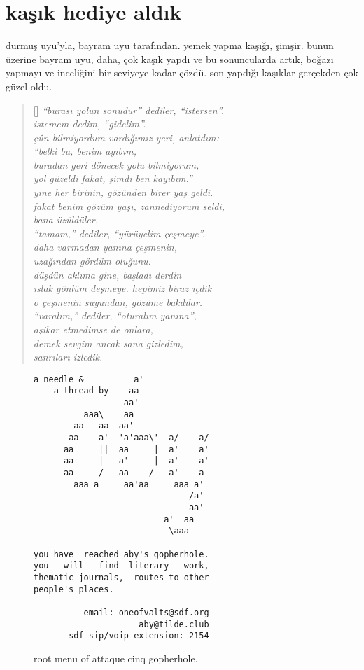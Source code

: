 \documentclass[9pt, a5paper, twocolumn, openright]{memoir}
\begin{document}
\section{kaşık hediye aldık}
durmuş uyu'yla, bayram uyu tarafından. yemek yapma kaşığı, şimşir.
bunun üzerine bayram uyu, daha, çok kaşık yapdı ve bu sonuncularda artık,
boğazı yapmayı ve inceliğini bir seviyeye kadar çözdü. son yapdığı
kaşıklar gerçekden çok güzel oldu.
\begin{verse}[\versewidth]
  \itshape{}
  ``burası yolun sonudur'' dediler, ``istersen''.\\
  istemem dedim, ``gidelim''.\\
  çûn bilmiyordum vardığımız yeri, anlatdım:\\
  ``belki bu, benim ayıbım,\\
  buradan geri dönecek yolu bilmiyorum,\\
  yol güzeldi fakat, şimdi ben kayıbım.''\\
  yine her birinin, gözünden birer yaş geldi.\\
  fakat benim gözüm yaşı, zannediyorum seldi,\\
  bana üzüldüler.\\
  ``tamam,'' dediler, ``yürüyelim çeşmeye''.\\
  daha varmadan yanına çeşmenin,\\
  uzağından gördüm oluğunu.\\
  düşdün aklıma gine, başladı derdin\\
  ıslak gönlüm deşmeye. hepimiz biraz içdik\\
  o çeşmenin suyundan, gözüme bakdılar.\\
  ``varalım,'' dediler, ``oturalım yanına'',\\
  aşikar etmedimse de onlara,\\
  demek sevgim ancak sana gizledim,\\
  sanrıları izledik.\\
\end{verse}
\begin{figure}[H]
\begin{verbatim}
a needle &          a'
    a thread by    aa
                  aa'
          aaa\    aa
        aa   aa  aa'
       aa    a'  'a'aaa\'  a/    a/
      aa     ||  aa     |  a'    a'
      aa     |   a'     |  a'    a'
      aa     /   aa    /   a'    a
        aaa_a     aa'aa     aaa_a'
                               /a'
                               aa'
                          a'  aa
                           \aaa

you have  reached aby's gopherhole.
you   will   find  literary   work,
thematic journals,  routes to other
people's places.

          email: oneofvalts@sdf.org
                     aby@tilde.club
       sdf sip/voip extension: 2154
\end{verbatim}
  \caption{root menu of attaque cinq gopherhole.}
\end{figure}
\end{document}
